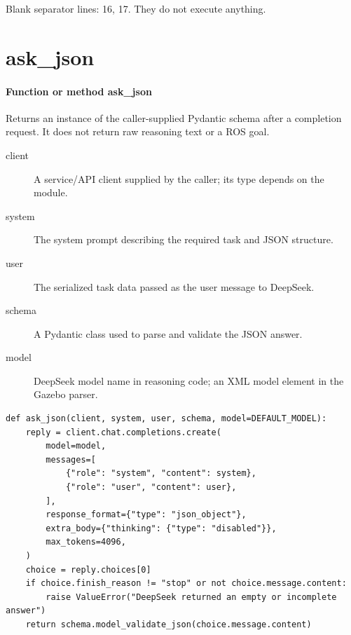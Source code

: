 \documentclass[11pt,a4paper]{book}
\begin{document}
Blank separator lines: 16, 17. They do not execute anything.

\section{ask\_json}

\paragraph{Function or method ask\_json}
Returns an instance of the caller-supplied Pydantic schema after a completion request. It does not return raw reasoning text or a ROS goal.

\begin{description}
\item[client] A service/API client supplied by the caller; its type depends on the module.
\item[system] The system prompt describing the required task and JSON structure.
\item[user] The serialized task data passed as the user message to DeepSeek.
\item[schema] A Pydantic class used to parse and validate the JSON answer.
\item[model] DeepSeek model name in reasoning code; an XML model element in the Gazebo parser.
\end{description}

\begin{lstlisting}[firstnumber=18]
def ask_json(client, system, user, schema, model=DEFAULT_MODEL):
    reply = client.chat.completions.create(
        model=model,
        messages=[
            {"role": "system", "content": system},
            {"role": "user", "content": user},
        ],
        response_format={"type": "json_object"},
        extra_body={"thinking": {"type": "disabled"}},
        max_tokens=4096,
    )
    choice = reply.choices[0]
    if choice.finish_reason != "stop" or not choice.message.content:
        raise ValueError("DeepSeek returned an empty or incomplete answer")
    return schema.model_validate_json(choice.message.content)
\end{lstlisting}
\end{document}
